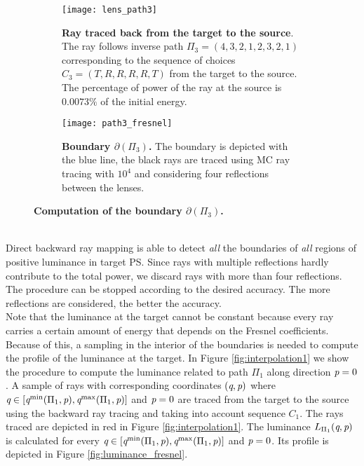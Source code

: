 \begin{figure}[t]
\centering
\begin{subfigure}[t]{.45\textwidth}
  \texttt{[image: lens\_path3]}
 \caption{\textbf{Ray traced back from the target to the source}. The ray follows inverse path $\Pi_3 = (4,3,2,1,2,3,2,1)$ corresponding to the sequence of choices $C_3=(T,R,R,R,R,T)$ from the target to the source. The percentage of power of the ray at the source is $0.0073\%$ of the initial energy.}
  \label{fig:ray_path3}
\end{subfigure}%
\hfill
\begin{subfigure}[t]{.45\textwidth}
  \texttt{[image: path3\_fresnel]}
  \caption{\textbf{Boundary $\partial$$(\Pi_3)$.} The boundary is depicted with the blue line, the black rays are traced using MC ray tracing with $10^4$ and considering four reflections between the lenses.} %
  \label{fig:boundary_path3}
\end{subfigure} %
\caption{\textbf{Computation of the boundary $\partial$$(\Pi_3)$.}}
\end{figure}
\\ \indent 
Direct backward ray mapping is able to detect \textit{all} the boundaries of \textit{all} regions of positive luminance in target PS. Since rays with multiple reflections hardly contribute to the total power, we discard rays with more than four reflections. The procedure can be stopped according to the desired accuracy. The more reflections are considered, the better the accuracy. \\ \indent
Note that the luminance at the target cannot be constant because every ray carries a certain amount of energy that depends on the Fresnel coefficients. Because of this, a sampling in the interior of the boundaries is needed to compute the profile of the luminance at the target. In Figure \ref{fig:interpolation1} we show the procedure to compute the luminance related to path $\Pi_1$ along direction $\textit{p}=0$. A sample of rays with corresponding coordinates $(\textit{q}, \textit{p})$ where $\textit{q}\in[\textit{q}^{\textrm{min}}(\Pi_1,\textit{p}), \textit{q}^{\textrm{max}}(\Pi_1,\textit{p})]$ and $\textit{p}=0$ are traced from the target to the source using the backward ray tracing and taking into account sequence $C_1$. The rays traced are depicted in red in Figure \ref{fig:interpolation1}. The luminance $L_{\Pi_1}(\textit{q}, \textit{p})$ is calculated for every $\textit{q}\in[\textit{q}^{\textrm{min}}(\Pi_1,\textit{p}), \textit{q}^{\textrm{max}}(\Pi_1,\textit{p})]$ and $\textit{p}=0$. Its profile is depicted in Figure \ref{fig:luminance_fresnel}.
